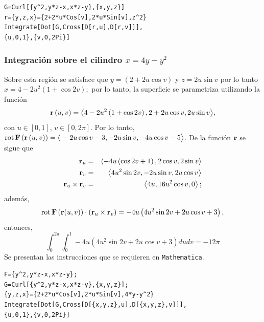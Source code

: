 \begin{tcolorbox}[title=\bf Instrucción \verb"Mathematica"]\begin{Verbatim}[formatcom=\letraverbatim]
G=Curl[{y^2,y*z-x,x*z-y},{x,y,z}]
r={y,z,x}={2+2*u*Cos[v],2*u*Sin[v],z^2}
Integrate[Dot[G,Cross[D[r,u],D[r,v]]],
{u,0,1},{v,0,2Pi}]
\end{Verbatim}
\end{tcolorbox}

\subsubsection{Integración sobre el cilindro \texorpdfstring{$x=4y-y^{2}$}{x=4y-y^2}}

Sobre esta región se satisface que
$y= (2+2u\cos v)$ y $z=2u\sin v$ por lo tanto $x=4-2u^{2}\left( 1+\cos 2v\right);$
por lo tanto, la superficie se parametriza utilizando la función
\[{\bf r}\left( u,v\right) =\left\langle 4-2u^{2}\left( 1+\cos 2v\right) ,2+2u\cos v,2u\sin v\right\rangle\!,\]
con $u\in[0,1],\, v\in [0,2\pi]$.
Por lo tanto, ${\rm rot}\,{\bf F}\left({\bf r}\left( u,v\right)\right) =\big \langle -2u\cos v-3,-2u\sin v,-4u\cos v-5\big \rangle$.
De la función ${\bf r}$ se sigue que
\begin{eqnarray*}
{\bf r}_{u} &=& \left\langle -4u\left( \cos 2v+1\right) ,2\cos v,2\sin v\right\rangle \\
{\bf r}_{v}&=& \left\langle 4u^{2}\sin 2v,-2u\sin v,2u\cos v\right\rangle \\
{\bf r}_{u}\times {\bf r}_{v}&=& \left\langle 4u,16u^{2}\cos v,0\right\rangle;
\end{eqnarray*}
además, \[{\rm rot}\,{\bf F}\left({\bf r}(u,v) \right)\cdot\left({\bf r}_{u}\times {\bf r}_{v}\right)= -4u\left( 4u^{2}\sin 2v+2u\cos v+3\right),\]
entonces,
\begin{equation}\label{stokes7}
\int_{0}^{2\pi }\int_{0}^{1}-4u\left( 4u^{2}\sin 2v+2u\cos v+3\right)dudv= -12\pi
\end{equation}
Se presentan las instrucciones que se requieren en \verb"Mathematica".

\begin{tcolorbox}[title=\bf Instrucción \verb"Mathematica"]\begin{Verbatim}[formatcom=\letraverbatim]
F={y^2,y*z-x,x*z-y};
G=Curl[{y^2,y*z-x,x*z-y},{x,y,z}];
{y,z,x}={2+2*u*Cos[v],2*u*Sin[v],4*y-y^2}
Integrate[Dot[G,Cross[D[{x,y,z},u],D[{x,y,z},v]]],
{u,0,1},{v,0,2Pi}]
\end{Verbatim}
\end{tcolorbox}

